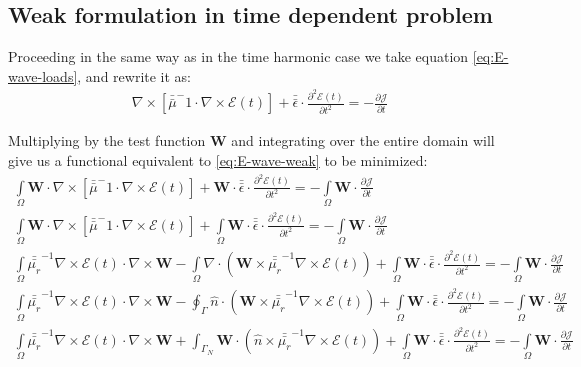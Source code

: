 \subsection{Weak formulation in time dependent problem}
Proceeding in the same way as in the time harmonic case we take equation
\ref{eq:E-wave-loads}, and rewrite it as:
\begin{align}
\nabla\times\left[\bar{\bar{\mu}}^-1\cdot\nabla \times\mathcal{E}(t)\right] + \bar{\bar{\epsilon}}\cdot\frac{\partial^2 \mathcal{E}(t)}{\partial t^2}=-\frac{\partial \mathcal{J}}{\partial t} 
\end{align}

Multiplying by the test function $\mathbf{W}$ and integrating over the entire domain will give us a functional equivalent to \ref{eq:E-wave-weak} to be minimized: 
\begin{align}
\int\limits_{\Omega}\mathbf{W}\cdot\nabla\times\left[\bar{\bar{\mu}}^-1\cdot\nabla \times\mathcal{E}(t)\right] + \mathbf{W}\cdot\bar{\bar{\epsilon}}\cdot\frac{\partial ^2\mathcal{E}(t)}{\partial t^2}=-\int\limits_{\Omega}\mathbf{W}\cdot\frac{\partial \mathcal{J}}{\partial t} \nonumber\\
\int\limits_{\Omega}\mathbf{W}\cdot\nabla\times\left[\bar{\bar{\mu}}^-1\cdot\nabla \times\mathcal{E}(t)\right] +\int\limits_{\Omega} \mathbf{W}\cdot\bar{\bar{\epsilon}}\cdot\frac{\partial ^2\mathcal{E}(t)}{\partial t^2}=-\int\limits_{\Omega}\mathbf{W}\cdot\frac{\partial \mathcal{J}}{\partial t} \nonumber\\
\int\limits_{\Omega} \bar{\bar{\mu_r}}^{-1}\nabla\times \mathcal{E}(t)\cdot \nabla\times\mathbf{W}-\int\limits_{\Omega}\nabla\cdot
\left(\mathbf{W}\times\bar{\bar{\mu_r}}^{-1}\nabla\times \mathcal{E}(t)
\right) +\int\limits_{\Omega} \mathbf{W}\cdot\bar{\bar{\epsilon}}\cdot\frac{\partial ^2\mathcal{E}(t)}{\partial t^2}=-\int\limits_{\Omega}\mathbf{W}\cdot\frac{\partial \mathcal{J}}{\partial t} \nonumber\\
\int\limits_{\Omega} \bar{\bar{\mu_r}}^{-1}\nabla\times \mathcal{E}(t)\cdot \nabla\times\mathbf{W}-\oint_{\Gamma}\hat{n}\cdot
\left(\mathbf{W}\times\bar{\bar{\mu_r}}^{-1}\nabla \times\mathcal{E}(t)\right)  +\int\limits_{\Omega} \mathbf{W}\cdot\bar{\bar{\epsilon}}\cdot\frac{\partial ^2\mathcal{E}(t)}{\partial t^2}=-\int\limits_{\Omega}\mathbf{W}\cdot\frac{\partial \mathcal{J}}{\partial t} \nonumber\\
\int\limits_{\Omega} \bar{\bar{\mu_r}}^{-1}\nabla\times \mathcal{E}(t)\cdot \nabla\times\mathbf{W}
+\int_{\Gamma_N}\mathbf{W}\cdot
\left(\hat{n}\times\bar{\bar{\mu_r}}^{-1}\nabla \times\mathcal{E}(t)\right)
+\int\limits_{\Omega} \mathbf{W}\cdot\bar{\bar{\epsilon}}\cdot\frac{\partial ^2\mathcal{E}(t)}{\partial t^2}=-\int\limits_{\Omega}\mathbf{W}\cdot\frac{\partial \mathcal{J}}{\partial t} \label{eq:time_dependent_Electric}
\end{align}

